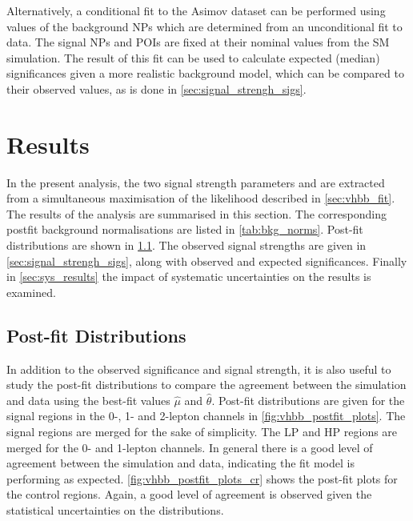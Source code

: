 Alternatively, a conditional fit to the Asimov dataset can be performed using values of the background NPs which are determined from an unconditional fit to data.
The signal NPs and POIs are fixed at their nominal values from the SM simulation.
The result of this fit can be used to calculate expected (median) significances given a more realistic background model, which can be compared to their observed values, as is done in \cref{sec:signal_strengh_sigs}.

\section{Results}\label{sec:vhbb_results}

In the present analysis, the two signal strength parameters \muVH and \muVZ are extracted from a simultaneous maximisation of the likelihood described in \cref{sec:vhbb_fit}.
The results of the analysis are summarised in this section.
The corresponding postfit background normalisations are listed in \cref{tab:bkg_norms}.
Post-fit \mJ distributions are shown in \cref{sec:postfit_plots}.
The observed signal strengths are given in \cref{sec:signal_strengh_sigs}, along with observed and expected significances.
Finally in \cref{sec:sys_results} the impact of systematic uncertainties on the results is examined.



\subsection{Post-fit Distributions}\label{sec:postfit_plots}
In addition to the observed significance and signal strength, it is also useful to study the post-fit \mJ distributions to compare the agreement between the simulation and data using the best-fit values $\hat{\mu}$ and $\hat{\theta}$.
Post-fit \mJ distributions are given for the signal regions in the 0-, 1- and 2-lepton channels in \cref{fig:vhbb_postfit_plots}.
The signal regions are merged for the sake of simplicity.
The LP and HP regions are merged for the 0- and 1-lepton channels.
In general there is a good level of agreement between the simulation and data, indicating the fit model is performing as expected.
\cref{fig:vhbb_postfit_plots_cr} shows the post-fit plots for the \ttbar control regions.
Again, a good level of agreement is observed given the statistical uncertainties on the distributions.

